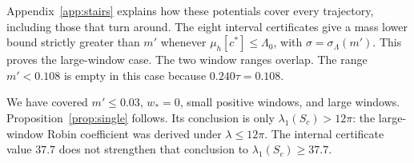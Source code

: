 Appendix~\ref{app:stairs} explains how these potentials cover every trajectory, including those that turn around. The eight interval certificates give a mass lower bound strictly greater than $m'$ whenever $\mu_h[c^*]\le\Lambda_0$, with $\sigma=\sigma_\Lambda(m')$. This proves the large-window case. The two window ranges overlap. The range $m'<0.108$ is empty in this case because $0.240\tau=0.108$.

We have covered $m'\le0.03$, $w_*=0$, small positive windows, and large windows. Proposition~\ref{prop:single} follows. Its conclusion is only $\lambda_1(S_c)>12\pi$: the large-window Robin coefficient was derived under $\lambda\le12\pi$. The internal certificate value $37.7$ does not strengthen that conclusion to $\lambda_1(S_c)\ge37.7$.
